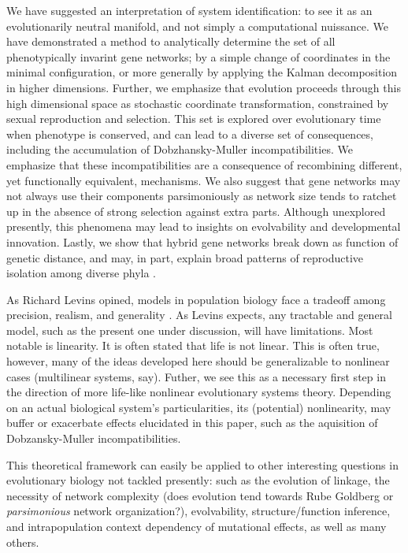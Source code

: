 \documentclass[9 pt]{article}
\newcommand{\jss}[1]{{\color{olive}\it #1}}
\newcommand{\1}{\mathbbm{1}}
\begin{document}
  We have suggested an interpretation of system identification: to see it as an evolutionarily neutral manifold, and not simply a computational nuissance. We have demonstrated a method to analytically determine the set of all phenotypically invarint gene networks; by a simple change of coordinates in the minimal configuration, or more generally by applying the Kalman decomposition in higher dimensions. Further, we emphasize that evolution proceeds through this high dimensional space as stochastic coordinate transformation, constrained by sexual reproduction and selection. This set is explored over evolutionary time when phenotype is conserved, and can lead to a diverse set of consequences, including the accumulation of Dobzhansky-Muller incompatibilities. We emphasize that these incompatibilities are a consequence of recombining different, yet functionally equivalent, mechanisms. We also suggest that gene networks may not always use their components parsimoniously as network size tends to ratchet up in the absence of strong selection against extra parts. Although unexplored presently, this phenomena may lead to insights on evolvability and developmental innovation. Lastly, we show that hybrid gene networks break down as function of genetic distance, and may, in part, explain broad patterns of reproductive isolation among diverse phyla \citep{roux2016shedding}.

  As Richard Levins opined, models in population biology face a tradeoff among precision, realism, and generality \citep{levins1966strategy}. As Levins expects, any tractable and general model, such as the present one under discussion, will have limitations. Most notable is linearity. It is often stated that life is not linear. This is often true, however, many of the ideas developed here should be generalizable to nonlinear cases (multilinear systems, say). Futher, we see this as a necessary first step in the direction of more life-like nonlinear evolutionary systems theory. Depending on an actual biological system's particularities, its (potential) nonlinearity, may buffer or exacerbate effects elucidated in this paper, such as the aquisition of Dobzansky-Muller incompatibilities.

  This theoretical framework can easily be applied to other interesting questions in evolutionary biology not tackled presently: such as the evolution of linkage, the necessity of network complexity (does evolution tend towards Rube Goldberg or \jss{parsimonious} network organization?), evolvability, structure/function inference, and intrapopulation context dependency of mutational effects, as well as many others.
\end{document}
